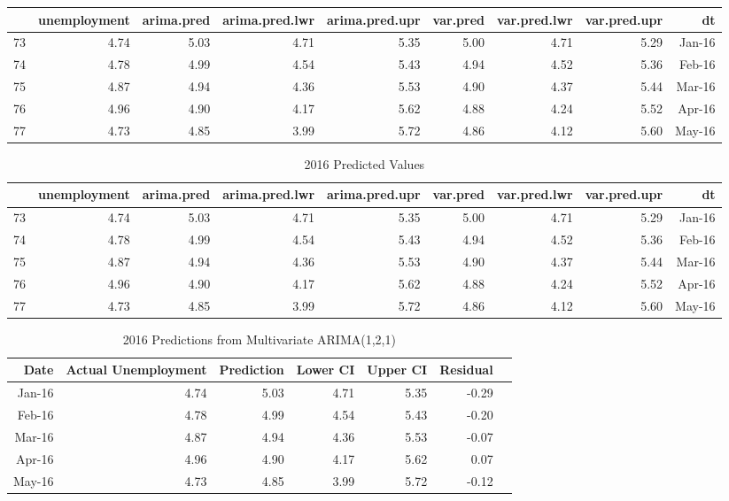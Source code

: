 \documentclass[twoside,twocolumn]{article}
\begin{document}
\begin{table}[ht]
\centering
\begin{tabular}{rrrrrrrrr}
  \hline
 & unemployment & arima.pred & arima.pred.lwr & arima.pred.upr & var.pred & var.pred.lwr & var.pred.upr & dt \\ 
  \hline
73 & 4.74 & 5.03 & 4.71 & 5.35 & 5.00 & 4.71 & 5.29 & Jan-16 \\ 
  74 & 4.78 & 4.99 & 4.54 & 5.43 & 4.94 & 4.52 & 5.36 & Feb-16 \\ 
  75 & 4.87 & 4.94 & 4.36 & 5.53 & 4.90 & 4.37 & 5.44 & Mar-16 \\ 
  76 & 4.96 & 4.90 & 4.17 & 5.62 & 4.88 & 4.24 & 5.52 & Apr-16 \\ 
  77 & 4.73 & 4.85 & 3.99 & 5.72 & 4.86 & 4.12 & 5.60 & May-16 \\ 
   \hline
\end{tabular}
\end{table}

\begin{table}[ht]
\centering
\caption{2016 Predicted Values}
\begin{tabular}{rrrrrrrrr}
  \hline
 & unemployment & arima.pred & arima.pred.lwr & arima.pred.upr & var.pred & var.pred.lwr & var.pred.upr & dt \\ 
  \hline
73 & 4.74 & 5.03 & 4.71 & 5.35 & 5.00 & 4.71 & 5.29 & Jan-16 \\ 
  74 & 4.78 & 4.99 & 4.54 & 5.43 & 4.94 & 4.52 & 5.36 & Feb-16 \\ 
  75 & 4.87 & 4.94 & 4.36 & 5.53 & 4.90 & 4.37 & 5.44 & Mar-16 \\ 
  76 & 4.96 & 4.90 & 4.17 & 5.62 & 4.88 & 4.24 & 5.52 & Apr-16 \\ 
  77 & 4.73 & 4.85 & 3.99 & 5.72 & 4.86 & 4.12 & 5.60 & May-16 \\ 
   \hline
\end{tabular}
\end{table}


\begin{table}[ht]
\centering
\caption{2016 Predictions from Multivariate ARIMA(1,2,1)}
\begin{tabular}{rrrrrrr}
  \hline
 Date & Actual Unemployment & Prediction & Lower CI & Upper CI & Residual \\ 
  \hline
Jan-16 & 4.74 & 5.03 & 4.71 & 5.35 & -0.29 \\ 
Feb-16 & 4.78 & 4.99 & 4.54 & 5.43 & -0.20 \\ 
Mar-16 & 4.87 & 4.94 & 4.36 & 5.53 & -0.07 \\ 
Apr-16 & 4.96 & 4.90 & 4.17 & 5.62 & 0.07 \\ 
May-16 & 4.73 & 4.85 & 3.99 & 5.72 & -0.12 \\  \hline
   \hline
\end{tabular}
\end{table}
\end{document}
